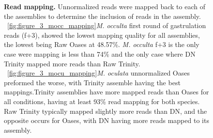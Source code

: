 \documentclass[fleqn,10pt]{wlpeerj}
\begin{document}
\begin{figure}[tbp]
	\begin{center}
	\end{center}
	\caption{\textbf{Read mapping.} Unnormalized reads were mapped back to each of the assemblies to determine the inclusion of reads in the assembly. ~\ref{fig:figure_3_mocc_mapping}\textit{M. occulta} first round of gastrulation reads (f+3), showed the lowest mapping quality for all assemblies, the lowest being Raw Oases at 48.57\%. \textit{M. occulta} f+3 is the only case were mapping is less than 74\% and the only case where DN Trinity mapped more reads than Raw Trinity. ~\ref{fig:figure_3_mocu_mapping}\textit{M. oculata} unnormalized Oases preformed the worse, with Trinity assemble having the best mappings.Trinity assemblies have more mapped reads than Oases for all conditions, having at least 93\% read mapping for both species. Raw Trinity typically mapped slightly more reads than DN, and the opposite occurs for Oases, with DN having more reads mapped to its assembly.}
	\label{fig:read_mapping}
\end{figure}
\end{document}

